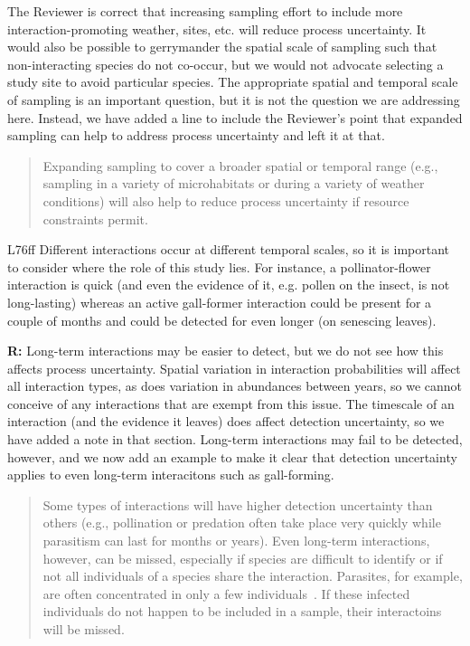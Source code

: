 \documentclass[12pt]{letter}
\begin{document}
The Reviewer is correct that increasing sampling effort to include more interaction-promoting weather, sites, etc. will reduce process uncertainty. It would also be possible to gerrymander the spatial scale of sampling such that non-interacting species do not co-occur, but we would not advocate selecting a study site to avoid particular species. The appropriate spatial and temporal scale of sampling is an important question, but it is not the question we are addressing here. Instead, we have added a line to include the Reviewer's point that expanded sampling can help to address process uncertainty and left it at that.

	\begin{quotation}

	Expanding sampling to cover a broader spatial or temporal range (e.g., sampling in a variety of microhabitats or during a variety of weather conditions) will also help to reduce process uncertainty if resource constraints permit.

	\end{quotation}



L76ff Different interactions occur at different temporal scales, so it is important to consider where the role of this study lies. For instance, a pollinator-flower interaction is quick (and even the evidence of it, e.g. pollen on the insect, is not long-lasting) whereas an active gall-former interaction could be present for a couple of months and could be detected for even longer (on senescing leaves).


\textbf{R:} Long-term interactions may be easier to detect, but we do not see how this affects process uncertainty. Spatial variation in interaction probabilities will affect all interaction types, as does variation in abundances between years, so we cannot conceive of any interactions that are exempt from this issue. The timescale of an interaction (and the evidence it leaves) does affect detection uncertainty, so we have added a note in that section. Long-term interactions may fail to be detected, however, and we now add an example to make it clear that detection uncertainty applies to even long-term interacitons such as gall-forming.

	\begin{quotation}

		Some types of interactions will have higher detection uncertainty than others (e.g., pollination or predation often take place very quickly while parasitism can last for months or years). Even long-term interactions, however, can be missed, especially if species are difficult to identify or if not all individuals of a species share the interaction. Parasites, for example, are often concentrated in only a few individuals~\citep{Lagrue2017}. If these infected individuals do not happen to be included in a sample, their interactoins will be missed.

	\end{quotation}
\end{document}
